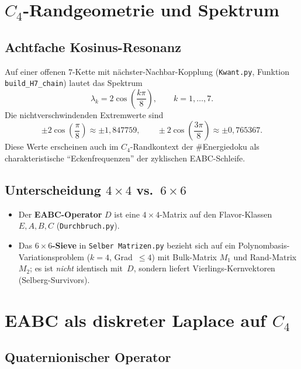 \documentclass[12pt,a4paper]{article}
\begin{document}
\section{$C_4$-Randgeometrie und Spektrum}
\label{sec:c4}

\subsection{Achtfache Kosinus-Resonanz}

Auf einer offenen $7$-Kette mit nächster-Nachbar-Kopplung
(\texttt{Kwant.py}, Funktion \texttt{build\_H7\_chain}) lautet das
Spektrum
\[
\lambda_k = 2\cos\!\left(\frac{k\pi}{8}\right),\qquad k=1,\ldots,7.
\]
Die nichtverschwindenden Extremwerte sind
\[
\pm 2\cos\!\left(\frac{\pi}{8}\right)\approx\pm 1{,}847759,\qquad
\pm 2\cos\!\left(\frac{3\pi}{8}\right)\approx\pm 0{,}765367.
\]
Diese Werte erscheinen auch im $C_4$-Randkontext der
\#Energiedoku als charakteristische ``Eckenfrequenzen'' der
zyklischen EABC-Schleife.

\subsection{Unterscheidung $4\times 4$ vs.\ $6\times 6$}

\begin{itemize}[nosep]
  \item Der \textbf{EABC-Operator} $D$ ist eine $4\times 4$-Matrix
        auf den Flavor-Klassen $E,A,B,C$
        (\texttt{Durchbruch.py}).
  \item Das \textbf{$6\times 6$-Sieve} in \texttt{Selber Matrizen.py}
        bezieht sich auf ein Polynombasis-Variationsproblem
        ($k=4$, Grad~$\le 4$) mit Bulk-Matrix $M_1$ und Rand-Matrix $M_2$;
        es ist \emph{nicht} identisch mit~$D$, sondern liefert
        Vierlings-Kernvektoren (Selberg-Survivors).
\end{itemize}

\section{EABC als diskreter Laplace auf $C_4$}
\label{sec:eabc}

\subsection{Quaternionischer Operator}
\end{document}
